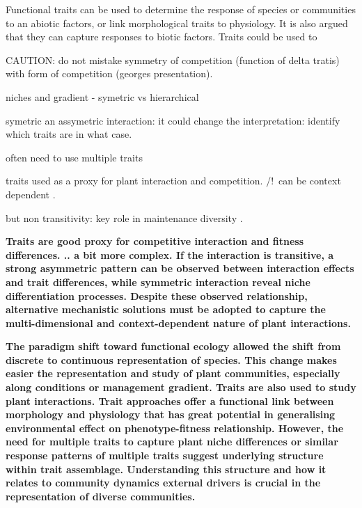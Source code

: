 Functional traits can be used to determine the response of species or communities to an abiotic factors, or link morphological traits to physiology. It is also argued that they can capture responses to biotic factors. Traits could be used to 

CAUTION: do not mistake symmetry of competition (function of delta tratis) with form of competition (georges presentation). 


niches and gradient - symetric vs hierarchical 

symetric an assymetric interaction: it could change the interpretation: identify which traits are in what case.


\parencite{kraft_functional_2008}
often need to use multiple traits \parencite{kraft_plant_2015}


traits used as a proxy for plant interaction and competition. /!\ can be context dependent \parencite{gallaway_2003}.

but non transitivity: key role in maintenance diversity \cite{levine_beyond_2017}.

\textbf{Traits are good proxy for competitive interaction and fitness differences. .. a bit more complex. If the interaction is transitive, a strong asymmetric pattern can be observed between interaction effects and trait differences, while symmetric interaction reveal niche differentiation processes. Despite these observed relationship, alternative mechanistic solutions must be adopted to capture the multi-dimensional and context-dependent nature of plant interactions.}


\textbf{The paradigm shift toward functional ecology allowed the shift from discrete to continuous representation of species. This change makes easier the representation and study of plant communities, especially along conditions or management gradient. Traits are also used to study plant interactions.  Trait approaches offer a functional link between morphology and physiology that has great potential in generalising environmental effect on phenotype-fitness relationship. However, the need for multiple traits to capture plant niche differences or similar response patterns of multiple traits suggest underlying structure within trait assemblage. Understanding this structure and how it relates to community dynamics external drivers is crucial in the representation of diverse communities. } 





